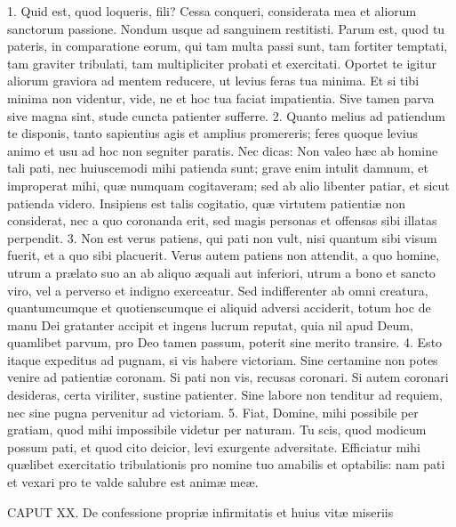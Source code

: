 \documentclass[twoside]{article}
\begin{document}
1. Quid est, quod loqueris, fili? Cessa conqueri, considerata mea et aliorum sanctorum passione. Nondum usque ad sanguinem restitisti. Parum est, quod tu pateris, in comparatione eorum, qui tam multa passi sunt, tam fortiter temptati, tam graviter tribulati, tam multipliciter probati et exercitati. Oportet te igitur aliorum graviora ad mentem reducere, ut levius feras tua minima. Et si tibi minima non videntur, vide, ne et hoc tua faciat impatientia. Sive tamen parva sive magna sint, stude cuncta patienter sufferre.
2. Quanto melius ad patiendum te disponis, tanto sapientius agis et amplius promereris; feres quoque levius animo et usu ad hoc non segniter paratis. Nec dicas: Non valeo hæc ab homine tali pati, nec huiuscemodi mihi patienda sunt; grave enim intulit damnum, et improperat mihi, quæ numquam cogitaveram; sed ab alio libenter patiar, et sicut patienda videro. Insipiens est talis cogitatio, quæ virtutem patientiæ non considerat, nec a quo coronanda erit, sed magis personas et offensas sibi illatas perpendit.
3. Non est verus patiens, qui pati non vult, nisi quantum sibi visum fuerit, et a quo sibi placuerit. Verus autem patiens non attendit, a quo homine, utrum a prælato suo an ab aliquo æquali aut inferiori, utrum a bono et sancto viro, vel a perverso et indigno exerceatur. Sed indifferenter ab omni creatura, quantumcumque et quotienscumque ei aliquid adversi acciderit, totum hoc de manu Dei gratanter accipit et ingens lucrum reputat, quia nil apud Deum, quamlibet parvum, pro Deo tamen passum, poterit sine merito transire.
4. Esto itaque expeditus ad pugnam, si vis habere victoriam. Sine certamine non potes venire ad patientiæ coronam. Si pati non vis, recusas coronari. Si autem coronari desideras, certa viriliter, sustine patienter. Sine labore non tenditur ad requiem, nec sine pugna pervenitur ad victoriam.
5. Fiat, Domine, mihi possibile per gratiam, quod mihi impossibile videtur per naturam. Tu scis, quod modicum possum pati, et quod cito deicior, levi exurgente adversitate. Efficiatur mihi quælibet exercitatio tribulationis pro nomine tuo amabilis et optabilis: nam pati et vexari pro te valde salubre est animæ meæ.


CAPUT XX.
De confessione propriæ infirmitatis et huius vitæ miseriis
\end{document}

